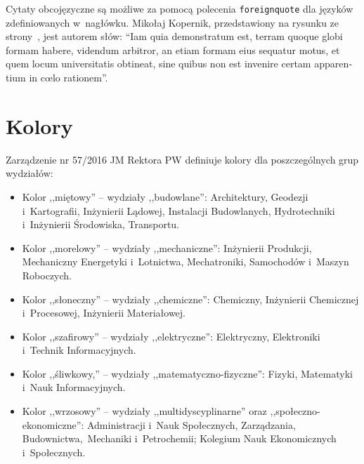 Cytaty obcojęzyczne są możliwe za pomocą polecenia \texttt{foreignquote} dla języków zdefiniowanych w~nagłówku. Mikołaj Kopernik, przedstawiony na rysunku ze strony~\pageref{rys:kopernik}, jest autorem słów: \foreignquote{latin}{Iam quia demonstratum est, terram quoque globi formam habere, videndum arbitror, an etiam formam eius sequatur motus, et quem locum universitatis obtineat, sine quibus non est invenire certam apparentium in cœlo rationem}.

\section{Kolory}
Zarządzenie nr 57/2016 JM Rektora PW definiuje kolory dla poszczególnych grup wydziałów:
\begin{itemize}
 \item Kolor ,,miętowy'' -- \colorbox{bud}{wydziały ,,budowlane'':}{\color{bud} Architektury, Geodezji i~Kartografii, Inżynierii Lądowej, Instalacji Budowlanych, Hydrotechniki i~Inżynierii Środowiska, Transportu.}
 \item Kolor ,,morelowy'' -- \colorbox{mech}{wydziały ,,mechaniczne'':}{\color{mech} Inżynierii Produkcji, Mechaniczny Energetyki i~Lotnictwa, Mechatroniki, Samochodów i~Maszyn Roboczych.}
 \item Kolor ,,słoneczny'' -- \colorbox{chem}{wydziały ,,chemiczne'':}{\color{chem} Chemiczny, Inżynierii Chemicznej i~Procesowej, Inżynierii Materiałowej.}
 \item Kolor ,,szafirowy'' -- \colorbox{elek}{wydziały ,,elektryczne'':}{\color{elek} Elektryczny, Elektroniki i~Technik Informacyjnych.}
 \item Kolor ,,śliwkowy,'' -- \colorbox{mfiz}{wydziały ,,matematyczno-fizyczne'':}{\color{mfiz} Fizyki, Matematyki i~Nauk Informacyjnych.}
 \item Kolor ,,wrzosowy'' -- \colorbox{multi}{wydziały ,,multidyscyplinarne'' oraz ,,społeczno-ekonomiczne'':}{\color{multi} Administracji i~Nauk Społecznych, Zarządzania, Budownictwa,~Mechaniki i~Petrochemii; Kolegium Nauk Ekonomicznych i~Społecznych.}
\end{itemize}

